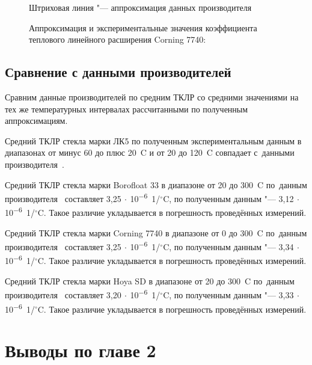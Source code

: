 \begin{samepage}
\begin{figure}[!htb]
    \caption{Аппроксимация и экспериментальные значения коэффициента теплового линейного расширения Corning 7740:}
    \label{fig:cte_7740+official}
    Штриховая линия "--- аппроксимация данных производителя
\end{figure}
\end{samepage}

\subsection{Сравнение с данными производителей}
Сравним данные производителей по средним ТКЛР со средними значениями на тех же температурных интервалах рассчитанными по полученным аппроксимациям.

Средний ТКЛР стекла марки ЛК5 по полученным экспериментальным данным в диапазонах от минус 60 до плюс 20~{\textdegree}C и от 20 до 120~{\textdegree}C  совпадает с~данными производителя~\cite{LK5_properties}.

Средний ТКЛР стекла марки Borofloat 33 в диапазоне от 20 до 300~{\textdegree}C по~данным производителя~\cite{bf33_properties} составляет 3,25$\:\cdot\:$10\textsuperscript{$-$6}~1/${}^\circ$C, по полученным данным "--- 3,12$\:\cdot\:$10\textsuperscript{$-$6}~1/${}^\circ$C. Такое различие укладывается в погрешность проведённых измерений.

Средний ТКЛР стекла марки Corning 7740 в диапазоне от 0 до 300~{\textdegree}C по~данным производителя~\cite{corning7740_wafersheet} составляет 3,25$\:\cdot\:$10\textsuperscript{$-$6}~1/${}^\circ$C, по полученным данным "--- 3,34$\:\cdot\:$10\textsuperscript{$-$6}~1/${}^\circ$C. Такое различие укладывается в погрешность проведённых измерений.

Средний ТКЛР стекла марки Hoya SD в диапазоне от 20 до 300~{\textdegree}C по~данным производителя~\cite{SD_2_properties} составляет 3,20$\:\cdot\:$10\textsuperscript{$-$6}~1/${}^\circ$C, по полученным данным "--- 3,33$\:\cdot\:$10\textsuperscript{$-$6}~1/${}^\circ$C. Такое различие укладывается в погрешность проведённых измерений.

\clearpage
\section{Выводы по главе 2}

